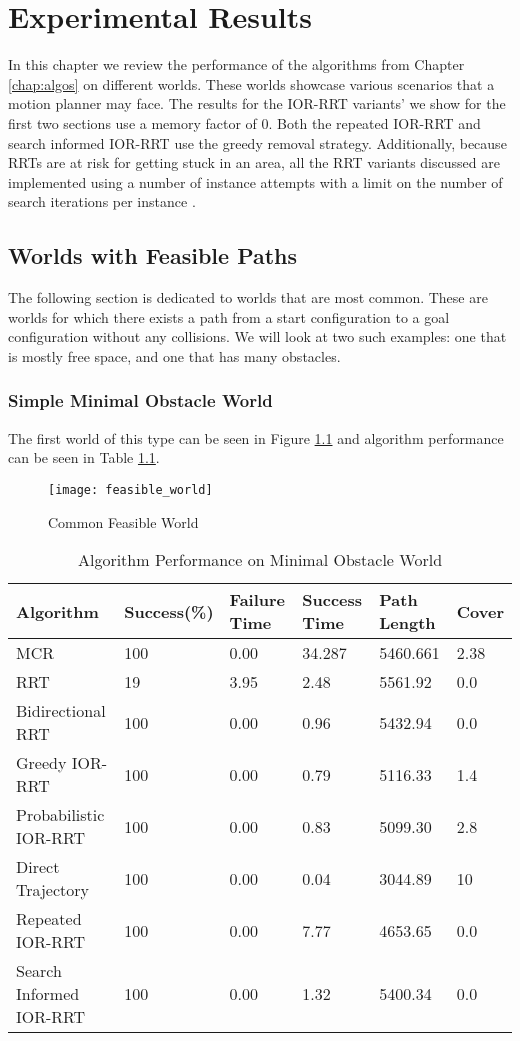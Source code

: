 \chapter{Experimental Results}
In this chapter we review the performance of the algorithms from Chapter \ref{chap:algos} on different worlds. These worlds showcase various scenarios that a motion planner may face. The results for the IOR-RRT variants' we show for the first two sections use a memory factor of 0. Both the repeated IOR-RRT and search informed IOR-RRT use the greedy removal strategy. Additionally, because RRTs are at risk for getting stuck in an area, all the RRT variants discussed are implemented using a number of instance attempts with a limit on the number of search iterations per instance \cite{wedge:heavytail}.

\section{Worlds with Feasible Paths}\label{results:feasible}
The following section is dedicated to worlds that are most common. These are worlds for which there exists a path from a start configuration to a goal configuration without any collisions. We will look at two such examples: one that is mostly free space, and one that has many obstacles.

\subsection{Simple Minimal Obstacle World}
The first world of this type can be seen in Figure \ref{fig:feasible_world} and algorithm performance can be seen in Table \ref{tab:feasible_world}. 

\begin{figure}[h!]
    \centering
    \texttt{[image: feasible\_world]}
    \caption{Common Feasible World}
    \label{fig:feasible_world}
\end{figure}

\begin{table}[h!]
\centering
\begin{tabular}{@{}llllll@{}}
\toprule
Algorithm & Success(\%)  & Failure Time  & Success Time  & Path Length & Cover\\ 
\midrule
MCR & 100 & 0.00 & 34.287 & 5460.661 & 2.38 \\
RRT & 19 & 3.95 & 2.48 & 5561.92 & 0.0 \\ 
Bidirectional RRT & 100 & 0.00 & 0.96 & 5432.94 & 0.0 \\
Greedy IOR-RRT & 100 & 0.00 & 0.79 & 5116.33 & 1.4 \\
Probabilistic IOR-RRT & 100 & 0.00 & 0.83 & 5099.30 & 2.8 \\
Direct Trajectory & 100 & 0.00 & 0.04 & 3044.89 & 10 \\
Repeated IOR-RRT & 100 & 0.00 & 7.77 & 4653.65 & 0.0 \\
Search Informed IOR-RRT & 100 & 0.00 & 1.32 & 5400.34 & 0.0 \\
\bottomrule
\end{tabular}
\caption{Algorithm Performance on Minimal Obstacle World}
\label{tab:feasible_world}
\end{table}

